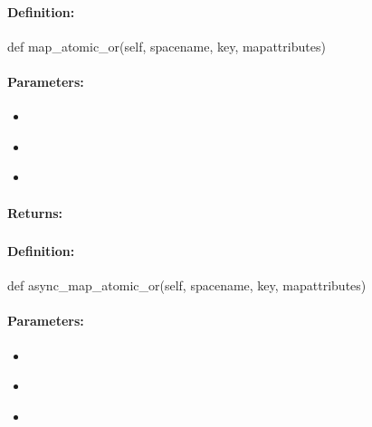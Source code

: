 \paragraph{Definition:}
\begin{pythoncode}
def map_atomic_or(self, spacename, key, mapattributes)
\end{pythoncode}

\paragraph{Parameters:}
\begin{itemize}[noitemsep]
\item {}\\

\item {}\\

\item {}\\

\end{itemize}

\paragraph{Returns:}


\pagebreak
\subsubsection{}
\label{api:python:async_map_atomic_or}


\paragraph{Definition:}
\begin{pythoncode}
def async_map_atomic_or(self, spacename, key, mapattributes)
\end{pythoncode}

\paragraph{Parameters:}
\begin{itemize}[noitemsep]
\item {}\\

\item {}\\

\item {}\\

\end{itemize}

